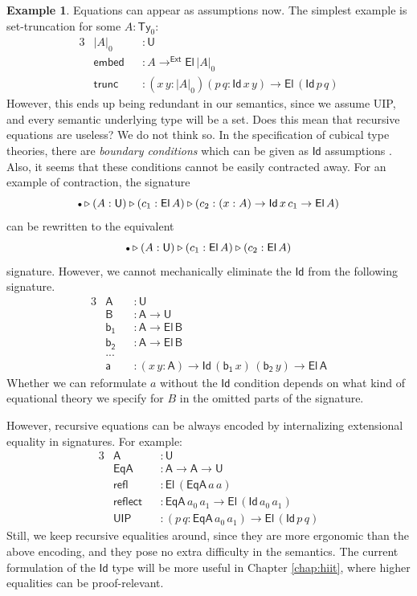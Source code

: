 \documentclass[12pt,a4paper,twoside,openany]{book}
\theoremstyle{remark}
\theoremstyle{definition}
\newtheorem{myexample}{Example}
\theoremstyle{theorem}
\newcommand{\ms}[1]{\mathsf{#1}}
\newcommand{\UIP}{\ms{UIP}}
\newcommand{\refl}{\mathsf{refl}}
\newcommand{\reflect}{\mathsf{reflect}}
\newcommand{\Ty}{\mathsf{Ty}}
\newcommand{\U}{\mathsf{U}}
\newcommand{\El}{\mathsf{El}}
\newcommand{\Id}{\mathsf{Id}}
\newcommand{\ext}{\triangleright}
\newcommand{\emptycon}{\scaleobj{.75}\bullet}
\newcommand{\toe}{\to^{\ms{Ext}}}
\begin{document}
\begin{myexample} Equations can appear as assumptions now. The simplest
example is set-truncation for some $A : \Ty_0$:
\begin{alignat*}{3}
  &|A|_0      &&: \U\\
  &\ms{embed} &&: A \toe \El\,|A|_0 \\
  &\ms{trunc} &&: (x\,y : |A|_0)(p\,q : \Id\,x\,y) \to \El\,(\Id\,p\,q)
\end{alignat*}
However, this ends up being redundant in our semantics, since we assume UIP, and
every semantic underlying type will be a set. Does this mean that recursive
equations are useless? We do not think so. In the specification of cubical type
theories, there are \emph{boundary conditions} which can be given as $\Id$
assumptions \cite{cchm,angiuli2016computational,angiuli2018cartesian}. Also, it
seems that these conditions cannot be easily contracted away. For an example of
contraction, the signature
\[\emptycon \ext (A : \U) \ext (c_1 : \El\,A) \ext (c_2 : (x : A) \to \Id\,x\,c_1 \to \El\,A)\]
can be rewritten to the equivalent
\[\emptycon \ext (A : \U) \ext (c_1 : \El\,A) \ext (c_2 : \El\,A)\]
signature. However, we cannot mechanically eliminate the $\Id$ from the following signature.
\begin{alignat*}{3}
  &\ms{A  } &&: \U\\
  &\ms{B  } &&: \ms{A} \to \U\\
  &\ms{b_1} &&: \ms{A} \to \El\,\ms{B}\\
  &\ms{b_2} &&: \ms{A} \to \El\,\ms{B}\\
  &...&&\\
  &\ms{a}   &&: (x\,y : \ms{A}) \to \Id\,(\ms{b_1}\,x)\,(\ms{b_2}\,y) \to \El\,\ms{A}
\end{alignat*}
Whether we can reformulate $a$ without the $\Id$ condition depends on what kind
of equational theory we specify for $B$ in the omitted parts of the signature.

However, recursive equations can be always encoded by internalizing extensional
equality in signatures. For example:
\begin{alignat*}{3}
  &\ms{A}   &&: \U \\
  &\ms{EqA} &&: \ms{A} \to \ms{A} \to \U\\
  &\refl    &&: \El\,(\ms{EqA}\,a\,a)\\
  &\reflect &&: \ms{EqA}\,a_0\,a_1 \to \El\,(\Id\,a_0\,a_1)\\
  &\UIP     &&: (p\,q : \ms{EqA}\,a_0\,a_1) \to \El\,(\Id\,p\,q)
\end{alignat*}
Still, we keep recursive equalities around, since they are more ergonomic than
the above encoding, and they pose no extra difficulty in the semantics. The
current formulation of the $\Id$ type will be more useful in Chapter \ref{chap:hiit},
where higher equalities can be proof-relevant.

\end{myexample}
\end{document}
